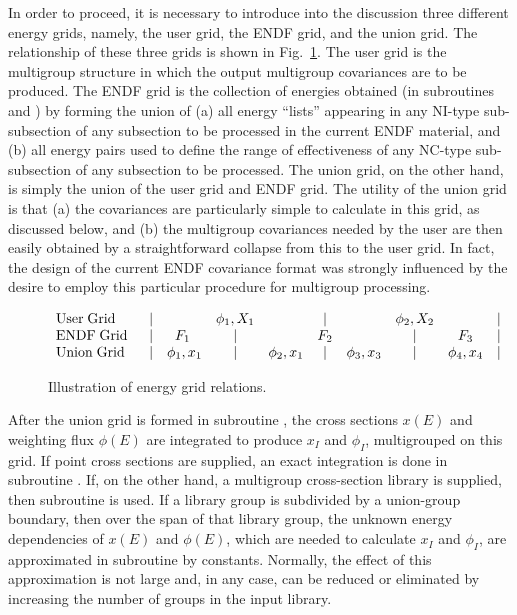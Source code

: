 In order to proceed, it is necessary to introduce into the discussion
three different energy grids, namely, the user grid, the ENDF grid, and
the union grid.  The relationship of these three grids is shown in
Fig.~\ref{grel}.  The user grid is the multigroup structure in which
the output multigroup covariances are to be produced.  The ENDF grid
is the collection of energies obtained (in subroutines
 and
) by forming
the union of (a) all energy ``lists'' appearing in any NI-type
sub-subsection of any subsection to be processed in the current ENDF
material, and (b) all energy pairs used to define the range of
effectiveness of any NC-type sub-subsection of any subsection to be
processed.  The union grid, on the other hand, is simply the union of
the user grid and ENDF grid.  The utility of the union grid is that (a)
the covariances are particularly simple to calculate in this grid, as
discussed below, and (b) the multigroup covariances needed by the user
are then easily obtained by a straightforward collapse from this to
the user grid.  In fact, the design of the current ENDF covariance
format was strongly influenced by the desire to employ this particular
procedure for multigroup processing\cite{Weisbin,Smith}.

\begin{figure}[b]\centering
$\begin{array}{lccccccccr}
{\rm User\; Grid} \; \;  &|&& \phi_1 , X_1  &  &|& & \phi_2 , X_2   &   &| \\
{\rm ENDF\; Grid} \; \;  &|& F_1 \; &|& &  F_2 & & |&  F_3               &| \\
{\rm Union \;Grid}  \; \;  &|&\phi_1 , x_1 &|& \phi_2 , x_1 &|&\phi_3 ,
   x_3 & | &\phi_4, x_4 &|\\
\end{array}$
\vspace{.25 in}
\caption{Illustration of energy grid relations.}
\label{grel}
\end{figure}

After the union grid is formed in subroutine
, the cross
sections $x(E)$ and weighting flux $\phi (E)$ are integrated to produce
$x_I$ and $\phi_I$, multigrouped on this grid.  If point cross sections
are supplied, an exact integration is done in subroutine
.  If, on the other hand, a
multigroup cross-section library is supplied, then subroutine
 is used.  If a library group
is subdivided by a union-group boundary, then over the span of that
library group, the unknown energy dependencies of $x(E)$ and $\phi
(E)$, which are needed to calculate $x_I$ and $\phi_I $, are
approximated in subroutine  by constants.  Normally, the
effect of this approximation is not large and, in any case, can be
reduced or eliminated by increasing the number of groups in the input
library.

